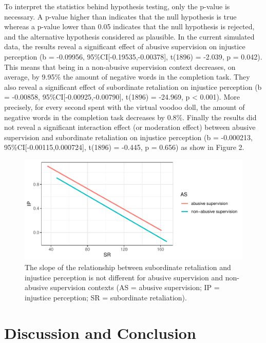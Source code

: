 \documentclass[
]{article}
\begin{document}
To interpret the statistics behind hypothesis testing, only the p-value
is necessary. A p-value higher than indicates that the null hypothesis
is true whereas a p-value lower than 0.05 indicates that the null
hypothesis is rejected, and the alternative hypothesis considered as
plausible. In the current simulated data, the results reveal a
significant effect of abusive supervision on injustice perception (b =
-0.09956, 95\%CI{[}-0.19535,-0.00378{]}, t(1896) = -2.039, p = 0.042).
This means that being in a non-abusive supervision context decreases, on
average, by 9.95\% the amount of negative words in the completion task.
They also reveal a significant effect of subordinate retaliation on
injustice perception (b = -0.00858, 95\%CI{[}-0.00925,-0.00790{]},
t(1896) = -24.969, p \textless{} 0.001). More precisely, for every
second spent with the virtual voodoo doll, the amount of negative words
in the completion task decreases by 0.8\%. Finally the results did not
reveal a significant interaction effect (or moderation effect) between
abusive supervision and subordinate retaliation on injustice perception
(b = -0.000213, 95\%CI{[}-0.00115,0.000724{]}, t(1896) = -0.445, p =
0.656) as show in Figure 2.

\begin{figure}
\centering
\includegraphics{voodoo_paper_dd_files/figure-latex/unnamed-chunk-2-1.pdf}
\caption{The slope of the relationship between subordinate retaliation
and injustice perception is not different for abusive supervision and
non-abusive supervision contexts (AS = abusive supervision; IP =
injustice perception; SR = subordinate retaliation).}
\end{figure}

\hypertarget{discussion-and-conclusion}{%
\section{Discussion and Conclusion}\label{discussion-and-conclusion}}
\end{document}
